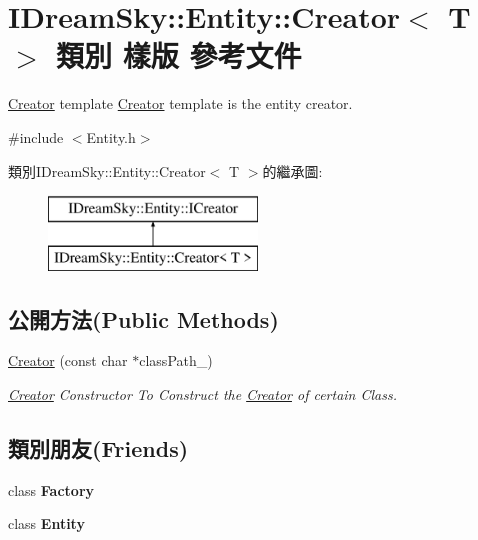 \hypertarget{class_i_dream_sky_1_1_entity_1_1_creator}{}\section{I\+Dream\+Sky\+:\+:Entity\+:\+:Creator$<$ T $>$ 類別 樣版 參考文件}
\label{class_i_dream_sky_1_1_entity_1_1_creator}


\hyperlink{class_i_dream_sky_1_1_entity_1_1_creator}{Creator} template \hyperlink{class_i_dream_sky_1_1_entity_1_1_creator}{Creator} template is the entity creator.  




{\ttfamily \#include $<$Entity.\+h$>$}

類別\+I\+Dream\+Sky\+:\+:Entity\+:\+:Creator$<$ T $>$的繼承圖\+:\begin{figure}[H]
\begin{center}
\leavevmode
\includegraphics[height=2.000000cm]{class_i_dream_sky_1_1_entity_1_1_creator}
\end{center}
\end{figure}
\subsection*{公開方法(Public Methods)}
\begin{DoxyCompactItemize}
\item 
\hyperlink{class_i_dream_sky_1_1_entity_1_1_creator_a48040d6a4acaf363e52988557a5f2c17}{Creator} (const char $\ast$class\+Path\+\_\+)
\begin{DoxyCompactList}\small\item\em \hyperlink{class_i_dream_sky_1_1_entity_1_1_creator}{Creator} Constructor To Construct the \hyperlink{class_i_dream_sky_1_1_entity_1_1_creator}{Creator} of certain Class. \end{DoxyCompactList}\end{DoxyCompactItemize}
\subsection*{類別朋友(Friends)}
\begin{DoxyCompactItemize}
\item 
class {\bfseries Factory}\hypertarget{class_i_dream_sky_1_1_entity_1_1_creator_a328c093d609680cca505905c6d49901a}{}\label{class_i_dream_sky_1_1_entity_1_1_creator_a328c093d609680cca505905c6d49901a}

\item 
class {\bfseries Entity}\hypertarget{class_i_dream_sky_1_1_entity_1_1_creator_a614439ccac0344926adc4c0165d64060}{}\label{class_i_dream_sky_1_1_entity_1_1_creator_a614439ccac0344926adc4c0165d64060}

\end{DoxyCompactItemize}
